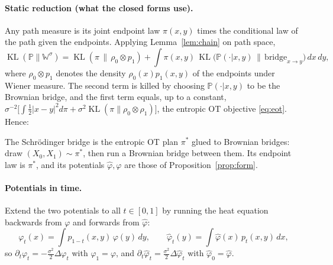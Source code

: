 \documentclass[11pt]{article}
\newcommand{\KL}{\operatorname{KL}}
\newcommand{\hphi}{\hat\varphi}
\theoremstyle{definition}
\theoremstyle{plain}
\begin{document}
\paragraph{Static reduction (what the closed forms use).}
Any path measure is its joint endpoint law $\pi(x,y)$ times the conditional law of the path
given the endpoints. Applying Lemma~\ref{lem:chain} on path space,
\[
  \KL(\mathbb{P}\|\mathbb{W}^\sigma)=\KL(\pi\,\|\,\rho_0\otimes p_1)+\int\pi(x,y)\,\KL\big(\mathbb{P}(\cdot|x,y)\,\|\,\text{bridge}_{x\to y}\big)\,dx\,dy ,
\]
where $\rho_0\otimes p_1$ denotes the density $\rho_0(x)p_1(x,y)$ of the endpoints under
Wiener measure. The second term is killed by choosing $\mathbb{P}(\cdot|x,y)$ to be the
Brownian bridge, and the first term equals, up to a constant,
$\sigma^{-2}\big[\int\tfrac12|x-y|^2d\pi+\sigma^2\KL(\pi\|\rho_0\otimes\rho_1)\big]$, the
entropic OT objective \eqref{eq:eot}. Hence:
\begin{keybox}
The Schr\"odinger bridge is the entropic OT plan $\pi^*$ glued to Brownian bridges:
draw $(X_0,X_1)\sim\pi^*$, then run a Brownian bridge between them. Its endpoint law is
$\pi^*$, and its potentials $\hphi,\varphi$ are those of Proposition~\ref{prop:form}.
\end{keybox}

\paragraph{Potentials in time.}
Extend the two potentials to all $t\in[0,1]$ by running the heat equation backwards from
$\varphi$ and forwards from $\hphi$:
\begin{equation}
  \label{eq:phit}
  \varphi_t(x)=\int p_{1-t}(x,y)\,\varphi(y)\,dy,\qquad
  \hphi_t(y)=\int\hphi(x)\,p_t(x,y)\,dx ,
\end{equation}
so $\partial_t\varphi_t=-\tfrac{\sigma^2}{2}\Delta\varphi_t$ with $\varphi_1=\varphi$, and
$\partial_t\hphi_t=\tfrac{\sigma^2}{2}\Delta\hphi_t$ with $\hphi_0=\hphi$.
\end{document}
